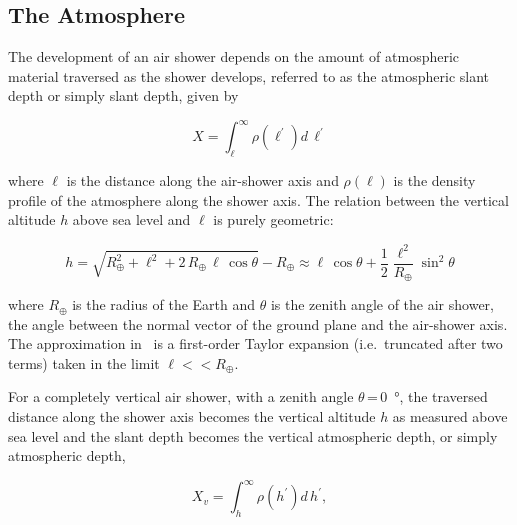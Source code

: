 


\subsection{The Atmosphere}\label{ssec:atmosphere}
The development of an air shower depends on the amount of atmospheric material traversed as the shower develops, referred to as the atmospheric slant depth or simply slant depth, given by

\begin{equation}
    X = \int_{\ell}^{\infty} \rho\left( \ell^{\prime} \right) d\,\ell^{\prime} \label{eq:slant}
\end{equation}

\noindent
where $\ell$ is the distance along the air-shower axis and $\rho\left(\ell\right)$ is the density profile of the atmosphere along the shower axis.
The relation between the vertical altitude $h$ above sea level and $\ell$ is purely geometric:

\begin{equation}
    h = \sqrt{R_{\oplus}^{2} + \ell^{2} + 2\,R_{\oplus}\,\ell\,\cos\theta} - R_{\oplus} \approx \ell\,\cos\theta + \frac{1}{2}\frac{\ell^{2}}{R_{\oplus}}\sin^{2}\theta \label{eq:law_of_cosines}
\end{equation}

\noindent
where $R_{\oplus}$ is the radius of the Earth and $\theta$ is the zenith angle of the air shower, the angle between the normal vector of the ground plane and the air-shower axis.
The approximation in~ is a first-order Taylor expansion (i.e.~truncated after two terms) taken in the limit $\ell << R_{\oplus}$.

For a completely vertical air shower, with a zenith angle $\theta$\,=\,\qty{0}{\degree}, the traversed distance along the shower axis becomes the vertical altitude $h$ as measured above sea level and the slant depth becomes the vertical atmospheric depth, or simply atmospheric depth,

\begin{equation}
    X_{v} = \int_{h}^{\infty} \rho\left( h^{\prime} \right) d\,h^{\prime}, \label{eq:vertical_depth}
\end{equation}


